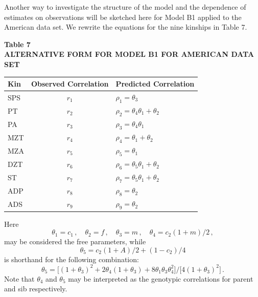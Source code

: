﻿\documentclass[12pt]{article}
\begin{document}
Another way to investigate the structure of the model and the dependence of estimates on observations will be sketched here for Model B1 applied to the American data set. We rewrite the equations for the nine kinships in Table 7.

\begin{center}
\textbf{Table 7}\\
\textbf{ALTERNATIVE FORM FOR MODEL B1 FOR AMERICAN DATA SET}
\end{center}
\begin{center}
\begin{tabular}{l c l}
\hline
Kin & Observed Correlation & Predicted Correlation \\
\hline
SPS & $r_1$ & $\rho_1 = \theta_3$ \\
PT & $r_2$ & $\rho_2 = \theta_4 \theta_1 + \theta_2$ \\
PA & $r_3$ & $\rho_3 = \theta_4 \theta_1$ \\
MZT & $r_4$ & $\rho_4 = \theta_1 + \theta_2$ \\
MZA & $r_5$ & $\rho_5 = \theta_1$ \\
DZT & $r_6$ & $\rho_6 = \theta_5 \theta_1 + \theta_2$ \\
ST & $r_7$ & $\rho_7 = \theta_5 \theta_1 + \theta_2$ \\
ADP & $r_8$ & $\rho_8 = \theta_2$ \\
ADS & $r_9$ & $\rho_9 = \theta_2$ \\
\hline
\end{tabular}
\end{center}
Here
\begin{equation*}
\theta_1 = c_1 \, , \quad \theta_2 = f \, , \quad \theta_3 = m \, , \quad \theta_4 = c_2(1+m)/2 \, ,
\end{equation*}
may be considered the free parameters, while
\begin{equation*}
\theta_5 = c_2(1+A)/2 + (1-c_2)/4
\end{equation*}
is shorthand for the following combination:
\begin{equation*}
\theta_5 = \big[(1+\theta_3)^2 + 2\theta_4(1+\theta_3) + 8\theta_1\theta_3\theta_4^2\big]/\big[4(1+\theta_3)^2\big] \, .
\end{equation*}
Note that $\theta_4$ and $\theta_5$ may be interpreted as the genotypic correlations for parent and sib respectively.
\end{document}
